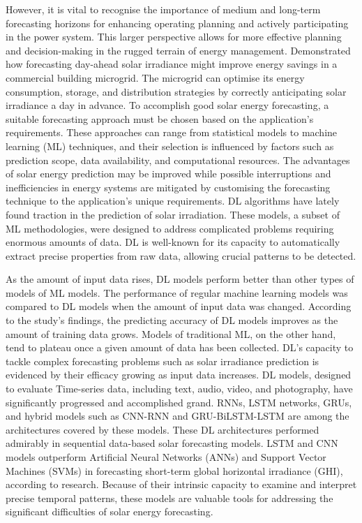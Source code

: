 However, it is vital to recognise the importance of medium and long-term forecasting horizons for enhancing operating planning and actively participating in the power system. This larger perspective allows for more effective planning and decision-making in the rugged terrain of energy management. Demonstrated how forecasting day-ahead solar irradiance might improve energy savings in a commercial building microgrid. The microgrid can optimise its energy consumption, storage, and distribution strategies by correctly anticipating solar irradiance a day in advance. To accomplish good solar energy forecasting, a suitable forecasting approach must be chosen based on the application's requirements. These approaches can range from statistical models to machine learning (ML) techniques, and their selection is influenced by factors such as prediction scope, data availability, and computational resources. The advantages of solar energy prediction may be improved while possible interruptions and inefficiencies in energy systems are mitigated by customising the forecasting technique to the application's unique requirements. DL algorithms have lately found traction in the prediction of solar irradiation. These models, a subset of ML methodologies, were designed to address complicated problems requiring enormous amounts of data. DL is well-known for its capacity to automatically extract precise properties from raw data, allowing crucial patterns to be detected\cite{husein2019day}.

As the amount of input data rises, DL models perform better than other types of models of ML models. The performance of regular machine learning models was compared to DL models when the amount of input data was changed. According to the study's findings, the predicting accuracy of DL models improves as the amount of training data grows\cite{rajagukguk2020review}. Models of traditional ML, on the other hand, tend to plateau once a given amount of data has been collected. DL's capacity to tackle complex forecasting problems such as solar irradiance prediction is evidenced by their efficacy growing as input data increases. DL models, designed to evaluate Time-series data, including text, audio, video, and photography, have significantly progressed and accomplished grand. RNNs, LSTM networks, GRUs, and hybrid models such as CNN-RNN and GRU-BiLSTM-LSTM are among the architectures covered by these models. These DL architectures performed admirably in sequential data-based solar forecasting models. LSTM and CNN models outperform Artificial Neural Networks (ANNs) and Support Vector Machines (SVMs) in forecasting short-term global horizontal irradiance (GHI), according to research. Because of their intrinsic capacity to examine and interpret precise temporal patterns, these models are valuable tools for addressing the significant difficulties of solar energy forecasting\cite{zang2020short}.

